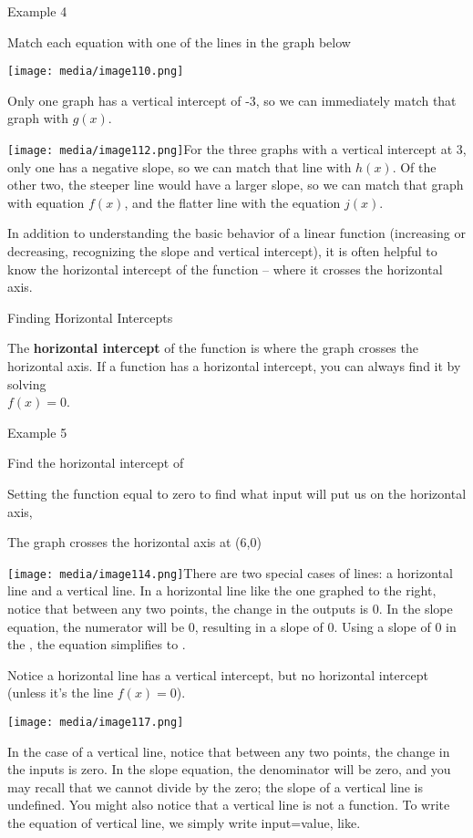 Example 4

Match each equation with one of the lines in the graph below

\texttt{[image: media/image110.png]}

Only one graph has a vertical intercept of -3, so we can immediately
match that graph with $g(x)$.

\texttt{[image: media/image112.png]}For
the three graphs with a vertical intercept at 3, only one has a negative
slope, so we can match that line with $h(x)$. Of the other two, the
steeper line would have a larger slope, so we can match that graph with
equation $f(x)$, and the flatter line with the equation
$j(x)$.

In addition to understanding the basic behavior of a linear function
(increasing or decreasing, recognizing the slope and vertical
intercept), it is often helpful to know the horizontal intercept of the
function -- where it crosses the horizontal axis.

Finding Horizontal Intercepts

The \textbf{horizontal intercept} of the function is where the graph
crosses the horizontal axis. If a function has a horizontal intercept,
you can always find it by solving\\
$f(x) = 0$.

Example 5

Find the horizontal intercept of

Setting the function equal to zero to find what input will put us on the
horizontal axis,

The graph crosses the horizontal axis at (6,0)

\texttt{[image: media/image114.png]}There
are two special cases of lines: a horizontal line and a vertical line.
In a horizontal line like the one graphed to the right, notice that
between any two points, the change in the outputs is 0. In the slope
equation, the numerator will be 0, resulting in a slope of 0. Using a
slope of 0 in the , the equation simplifies to .

Notice a horizontal line has a vertical intercept, but no horizontal
intercept (unless it's the line $f(x) = 0$).

\texttt{[image: media/image117.png]}

In the case of a vertical line, notice that between any two points, the
change in the inputs is zero. In the slope equation, the denominator
will be zero, and you may recall that we cannot divide by the zero; the
slope of a vertical line is undefined. You might also notice that a
vertical line is not a function. To write the equation of vertical line,
we simply write input=value, like.

